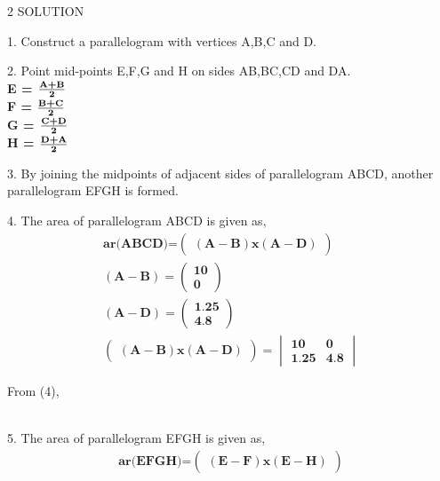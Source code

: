 \documentclass[a4paper,12pt]{report}
\newcommand{\myvec}[1]{\ensuremath{\begin{pmatrix}#1\end{pmatrix}}}
\let\vec\mathbf
\newcommand{\mydet}[1]{\ensuremath{\begin{vmatrix}#1\end{vmatrix}}}
\begin{document}
\begin{multicols}{2}
	\iffalse
\centering \large\textsc{2  S}\footnotesize\textsc{OLUTION}\vspace{5mm}\\
\raggedright\large{1. Construct a parallelogram with vertices A,B,C and D.}\vspace{2mm}\\
\raggedright\large{2. Point mid-points E,F,G and H on sides AB,BC,CD and DA.}\vspace{5mm}\\
\hspace{2cm}\textbf{E = $\frac{\textbf {A+B}}{\textbf 2}$}\vspace{2mm}\\
\hspace{2cm}\textbf{F = $\frac{\textbf {B+C}}{\textbf 2}$}\vspace{2mm}\\
\hspace{2cm}\textbf{G = $\frac{\textbf {C+D}}{\textbf 2}$}\vspace{2mm}\\
\hspace{2cm}\textbf{H = $\frac{\textbf {D+A}}{\textbf 2}$}\vspace{5mm}\\
\raggedright\large{3. By joining the midpoints of adjacent sides of parallelogram ABCD, another parallelogram EFGH is formed.}\vspace{2mm}\\
\raggedright\large{4. The area of parallelogram ABCD is given as,}\\
\begin{align} \textbf{ar(ABCD)=}\myvec{\vec{(A-B)x(A-D)}}\\
	\vec{(A-B)} = \myvec{\textbf{10}\\\textbf{0}}\\
		      \vec{(A-D)} = \myvec{\textbf{1.25}\\\textbf{4.8}}\\ 
		      \myvec{\vec{(A-B)x(A-D)}} = \mydet{\textbf{10}&\textbf{0}\\\textbf{1.25}&\textbf{4.8}}
\end{align}
\raggedright{From (4),}\\\vspace{5mm}\\
\raggedright\large{5. The area of parallelogram EFGH is given as,}\\
\begin{align} \textbf{ar(EFGH)=}\myvec{\vec{(E-F)x(E-H)}}\\

\end{align}
\end{multicols}
\end{document}
